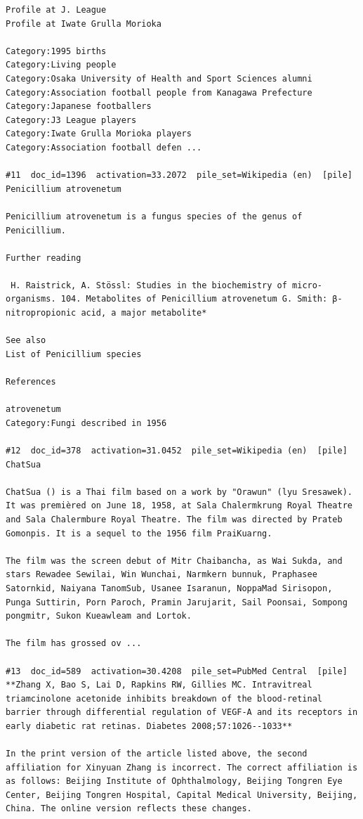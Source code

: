 \begin{verbatim}
Profile at J. League
Profile at Iwate Grulla Morioka

Category:1995 births
Category:Living people
Category:Osaka University of Health and Sport Sciences alumni
Category:Association football people from Kanagawa Prefecture
Category:Japanese footballers
Category:J3 League players
Category:Iwate Grulla Morioka players
Category:Association football defen ...

#11  doc_id=1396  activation=33.2072  pile_set=Wikipedia (en)  [pile]
Penicillium atrovenetum

Penicillium atrovenetum is a fungus species of the genus of Penicillium.

Further reading

 H. Raistrick, A. Stössl: Studies in the biochemistry of micro-organisms. 104. Metabolites of Penicillium atrovenetum G. Smith: β-nitropropionic acid, a major metabolite*

See also
List of Penicillium species

References

atrovenetum
Category:Fungi described in 1956

#12  doc_id=378  activation=31.0452  pile_set=Wikipedia (en)  [pile]
ChatSua

ChatSua () is a Thai film based on a work by "Orawun" (lyu Sresawek). It was premièred on June 18, 1958, at Sala Chalermkrung Royal Theatre and Sala Chalermbure Royal Theatre. The film was directed by Prateb Gomonpis. It is a sequel to the 1956 film PraiKuarng.

The film was the screen debut of Mitr Chaibancha, as Wai Sukda, and stars Rewadee Sewilai, Win Wunchai, Narmkern bunnuk, Praphasee Satornkid, Naiyana TanomSub, Usanee Isaranun, NoppaMad Sirisopon, Punga Suttirin, Porn Paroch, Pramin Jarujarit, Sail Poonsai, Sompong pongmitr, Sukon Kueawleam and Lortok.

The film has grossed ov ...

#13  doc_id=589  activation=30.4208  pile_set=PubMed Central  [pile]
**Zhang X, Bao S, Lai D, Rapkins RW, Gillies MC. Intravitreal triamcinolone acetonide inhibits breakdown of the blood-retinal barrier through differential regulation of VEGF-A and its receptors in early diabetic rat retinas. Diabetes 2008;57:1026--1033**

In the print version of the article listed above, the second affiliation for Xinyuan Zhang is incorrect. The correct affiliation is as follows: Beijing Institute of Ophthalmology, Beijing Tongren Eye Center, Beijing Tongren Hospital, Capital Medical University, Beijing, China. The online version reflects these changes.



\end{verbatim}
